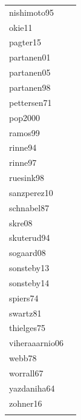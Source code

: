 \documentclass[11pt]{article}
\begin{document}
\begin{footnotesize}
\begin{longtable}{p{}p{}}
  nishimoto95 & \citep{Okie:2011aa} \\ 
  okie11 & \citep{Pagter:2015} \\ 
  pagter15 & \citep{Partanen:2001aa} \\ 
  partanen01 & \citep{Partanen:2005aa} \\ 
  partanen05 & \citep{Partanen:1998aa} \\ 
  partanen98 & \citep{Pettersen:1972aa} \\ 
  pettersen71 & \citep{Pop:2000aa} \\ 
  pop2000 & \citep{ramos:1999} \\ 
  ramos99 & \citep{Rinne:1994} \\ 
  rinne94 & \citep{Rinne:1997aa} \\ 
  rinne97 & \citep{Ruesink:1998aa} \\ 
  ruesink98 & \citep{Sanz-Perez:2009aa} \\ 
  sanzperez10 & \citep{Sanz-Perez:2010aa} \\ 
  schnabel87 & \citep{Schnabel:1987aa} \\ 
  skre08 & \citep{Skre:2008aa} \\ 
  skuterud94 & \citep{Skuterud:1994aa} \\ 
  sogaard08 & \citep{Sogaard:2008aa} \\ 
  sonsteby13 & \citep{Sonsteby:2013aa} \\ 
  sonsteby14 & \citep{Sonsteby:2014aa} \\ 
  spiers74 & \citep{Spiers:1974aa} \\ 
  swartz81 & \citep{Swartz:1981aa} \\ 
  thielges75 & \citep{Thielges:1976aa} \\ 
  viheraaarnio06 & \citep{Vihera-Aarnio:2006aa} \\ 
  webb78 & \citep{Webb:1977} \\ 
  worrall67 & \citep{Worrall:1967aa} \\ 
  yazdaniha64 & \citep{Yazdaniha:1967aa} \\ 
  zohner16 & \citep{zohner2016} \\ 
  \hline
\label{tab:ref}
\end{longtable}
\endgroup\end{footnotesize} 


\pagebreak
\end{document}
